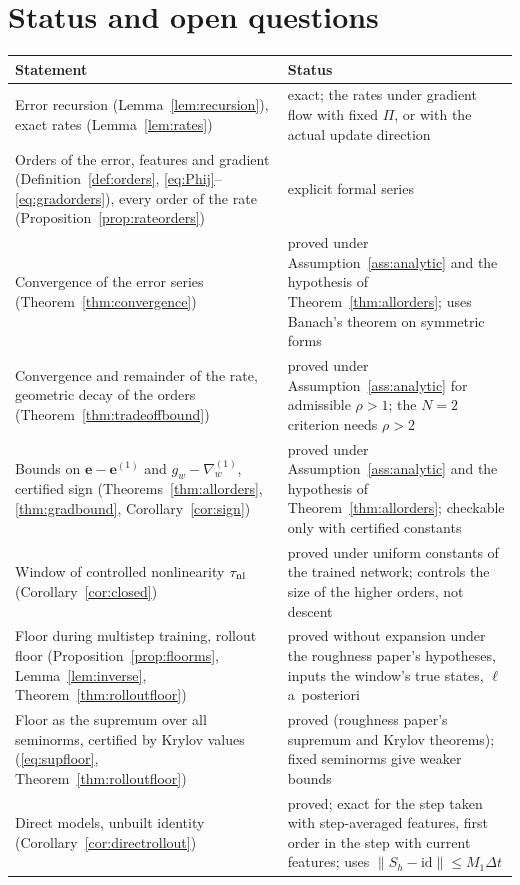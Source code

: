 \documentclass[11pt]{article}
\theoremstyle{definition}
\theoremstyle{remark}
\newcommand{\ee}{\mathbf{e}}
\newcommand{\dt}{\Delta t}
\begin{document}
\section{Status and open questions}\label{sec:status}

\begin{center}
\small
\begin{tabular}{p{}p{}}
\toprule
Statement & Status \\
\midrule
Error recursion (Lemma~\ref{lem:recursion}), exact rates (Lemma~\ref{lem:rates}) & exact; the rates under gradient flow with fixed $\Pi$, or with the actual update direction \\
Orders of the error, features and gradient (Definition~\ref{def:orders}, \eqref{eq:Phij}--\eqref{eq:gradorders}), every order of the rate (Proposition~\ref{prop:rateorders}) & explicit formal series \\
Convergence of the error series (Theorem~\ref{thm:convergence}) & proved under Assumption~\ref{ass:analytic} and the hypothesis of Theorem~\ref{thm:allorders}; uses Banach's theorem on symmetric forms \\
Convergence and remainder of the rate, geometric decay of the orders (Theorem~\ref{thm:tradeoffbound}) & proved under Assumption~\ref{ass:analytic} for admissible $\rho>1$; the $N=2$ criterion needs $\rho>2$ \\
Bounds on $\ee-\ee^{(1)}$ and $g_w-\nabla^{(1)}_w$, certified sign (Theorems~\ref{thm:allorders}, \ref{thm:gradbound}, Corollary~\ref{cor:sign}) & proved under Assumption~\ref{ass:analytic} and the hypothesis of Theorem~\ref{thm:allorders}; checkable only with certified constants \\
Window of controlled nonlinearity $\tau_{\rm nl}$ (Corollary~\ref{cor:closed}) & proved under uniform constants of the trained network; controls the size of the higher orders, not descent \\
Floor during multistep training, rollout floor (Proposition~\ref{prop:floorms}, Lemma~\ref{lem:inverse}, Theorem~\ref{thm:rolloutfloor}) & proved without expansion under the roughness paper's hypotheses, inputs the window's true states, $\ell$ a~posteriori \\
Floor as the supremum over all seminorms, certified by Krylov values (\eqref{eq:supfloor}, Theorem~\ref{thm:rolloutfloor}) & proved (roughness paper's supremum and Krylov theorems); fixed seminorms give weaker bounds \\
Direct models, unbuilt identity (Corollary~\ref{cor:directrollout}) & proved; exact for the step taken with step-averaged features, first order in the step with current features; uses $\|S_h-\mathrm{id}\|\le M_1\dt$ \\

\end{tabular}
\end{center}
\end{document}
